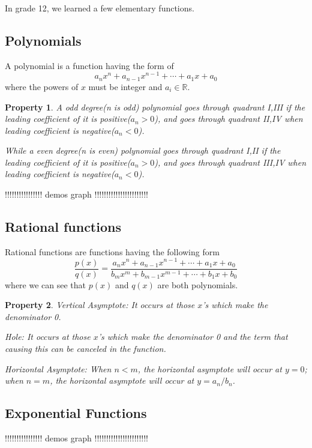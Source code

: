 \documentclass{article}
\newtheorem{property}{Property}
\begin{document}
In grade 12, we learned a few elementary functions. 
\subsection*{Polynomials}
A polynomial is a function having the form of
\[a_nx^n + a_{n-1}x^{n-1}+\cdots+a_1x +a_0\]
where the powers of $x$ must be integer and $a_i\in\mathbb{R}$.
  
\begin{property}
	A odd degree(n is odd) polynomial goes through quadrant I,III if the leading coefficient of it is positive($a_n>0$), and goes through quadrant II,IV when leading coefficient is negative($a_n<0$).
	
	While a even degree(n is even) polynomial goes through quadrant I,II if the leading coefficient of it is positive($a_n>0$), and goes through quadrant III,IV when leading coefficient is negative($a_n<0$).
\end{property}

\begin{center}
	!!!!!!!!!!!!!!!! demos graph !!!!!!!!!!!!!!!!!!!!!!!
\end{center}
\subsection*{Rational functions}
Rational functions are functions having the following form 
\[ \frac{p(x)}{q(x)} = \frac{a_nx^n + a_{n-1}x^{n-1}+\cdots+a_1x +a_0 }{b_mx^m + b_{m-1}x^{m-1}+\cdots+b_1x +b_0} \]
where we can see that $p(x)$ and $q(x)$ are both polynomials.

\begin{property}
	Vertical Asymptote: It occurs at those $x$'s which make the denominator 0.
	
	Hole: It occurs at those $x$'s which make the denominator 0 and the term that causing this can be canceled in the function.
	
	Horizontal Asymptote: When $n<m$, the horizontal asymptote will occur at $y=0$;
	when $n=m$, the horizontal asymptote will occur at $y=a_n/b_n$.
\end{property}

\subsection*{Exponential Functions}
\begin{center}
	!!!!!!!!!!!!!!!! demos graph !!!!!!!!!!!!!!!!!!!!!!!
\end{center}
\end{document}
